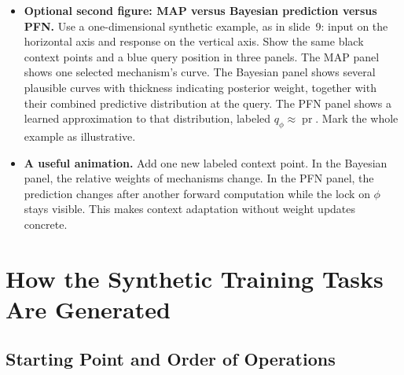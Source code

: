 \documentclass[11pt]{article}
\newcommand{\pr}{\operatorname{pr}}
\newenvironment{notes}
  {\begin{itemize}\setlength{\itemsep}{0.45em}\setlength{\parsep}{0pt}}
  {\end{itemize}}
\begin{document}
\begin{notes}
    \item \textbf{Optional second figure: MAP versus Bayesian
    prediction versus PFN.} Use a one-dimensional synthetic
    example, as in slide~9: input on the horizontal axis and
    response on the vertical axis. Show the same black context
    points and a blue query position in three panels.
    The MAP panel shows one selected mechanism's curve.
    The Bayesian panel shows several plausible curves with
    thickness indicating posterior weight, together with their
    combined predictive distribution at the query.
    The PFN panel shows a learned approximation to that
    distribution, labeled \(q_\phi\approx\pr\).
    Mark the whole example as illustrative.

    \item \textbf{A useful animation.} Add one new labeled
    context point. In the Bayesian panel, the relative weights
    of mechanisms change. In the PFN panel, the prediction
    changes after another forward computation while the lock
    on \(\phi\) stays visible. This makes context adaptation
    without weight updates concrete.
\end{notes}

\section{How the Synthetic Training Tasks Are Generated}
\label{sec:informed-prior}

\subsection{Starting Point and Order of Operations}
\label{sec:generation-order}
\end{document}
